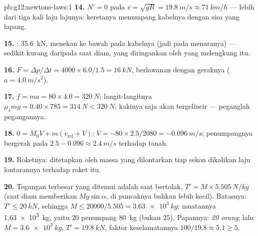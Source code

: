\begin{solution}{pb:g12:newtons-laws:1}
\textbf{14.} $N' = 0$ pada $v = \sqrt{gR} = \qty{19.8}{m/s} \approx
\qty{71}{km/h}$ --- lebih dari tiga kali laju lajunya: keretanya menumpang
kabelnya dengan sisa yang lapang.

\textbf{15.} : \qty{35.6}{kN}, menekan ke bawah pada
kabelnya (jadi pada menaranya) --- sedikit kurang daripada  saat diam,
yang diringankan oleh  yang melengkung itu.

\textbf{16.} $F = \Delta p/\Delta t = 4000 \times 6.0/1.5 =
\qty{16}{kN}$, berlawanan dengan geraknya ($a = \qty{4.0}{m/s^2}$).

\textbf{17.} $f = ma = 80 \times 4.0 = \qty{320}{N}$; langit-langitnya
$\mu_s mg = 0.40 \times 785 = \qty{314}{N} < \qty{320}{N}$: kakinya
saja akan tergelincir --- peganglah pegangannya.

\textbf{18.} $0 = M_0 V + m(v_{\text{rel}} + V)$:
$V = -80 \times 2.5/2080 = \qty{-0.096}{m/s}$; penumpangnya bergerak pada
$2.5 - 0.096 \approx \qty{2.4}{m/s}$ terhadap tanah.

\textbf{19.} Roketnya:  ditetapkan oleh massa yang dilontarkan tiap
sekon dikalikan laju lontarannya terhadap roket itu.

\textbf{20.} Tegangan terbesar yang ditemui adalah saat bertolak,
$T' = M \times \qty{5.505}{N/kg}$ (saat diam memberikan $Mg\sin\alpha$, di
puncaknya bahkan lebih kecil). Batasnya: $T' \leq \qty{20}{kN}$, sehingga
$M \leq 20000/5.505 = \qty{3.63e3}{kg}$: muatannya
\qty{1.63e3}{kg}, yaitu $20$ penumpang \qty{80}{kg} (bukan $25$).
Papannya: \emph{20 orang}; lalu $M = \qty{3.6e3}{kg}$,
$T' = \qty{19.8}{kN}$, faktor keselamatannya $100/19.8 \approx 5.1 \geq 5$.
\end{solution}

